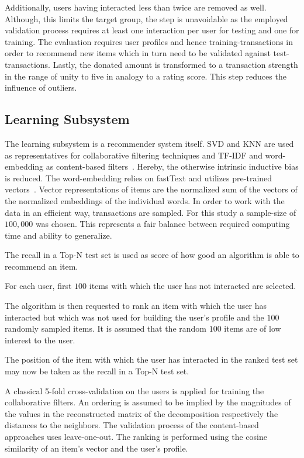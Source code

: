 \documentclass[runningheads]{llncs}
\begin{document}
Additionally, users having interacted less than twice are removed as well. Although, this limits the target group, the step is unavoidable as the employed validation process requires at least one interaction per user for testing and one for training. The evaluation requires user profiles and hence training-transactions in order to recommend new items which in turn need to be validated against test-transactions. Lastly, the donated amount is transformed to a transaction strength in the range of unity to five in analogy to a rating score. This step reduces the influence of outliers.

\subsection{Learning Subsystem}
The learning subsystem is a recommender system itself. SVD and KNN are used as representatives for collaborative filtering techniques and TF-IDF and word-embedding as content-based filters~\cite{scikit-learn,rehurek_lrec}. Hereby, the otherwise intrinsic inductive bias is reduced. The word-embedding relies on fastText and utilizes pre-trained vectors~\cite{DBLP:journals/corr/BojanowskiGJM16}. Vector representations of items are the normalized sum of the vectors of the normalized embeddings of the individual words. In order to work with the data in an efficient way, transactions are sampled. For this study a sample-size of $100,000$ was chosen. This represents a fair balance between required computing time and ability to generalize.

The recall in a Top-N test set is used as score of how good an algorithm is able to recommend an item.
\begin{enumerate*}[label= (\arabic*)]
	\item For each user, first $100$ items with which the user has not interacted are selected.
	\item The algorithm is then requested to rank an item with which the user has interacted but which was not used for building the user's profile and the $100$ randomly sampled items. It is assumed that the random $100$ items are of low interest to the user.
	\item The position of the item with which the user has interacted in the ranked test set may now be taken as the recall in a Top-N test set.
\end{enumerate*}

A classical 5-fold cross-validation on the users is applied for training the collaborative filters. An ordering is assumed to be implied by the magnitudes of the values in the reconstructed matrix of the decomposition respectively the distances to the neighbors. The validation process of the content-based approaches uses leave-one-out. The ranking is performed using the cosine similarity of an item's vector and the user's profile.
\end{document}
